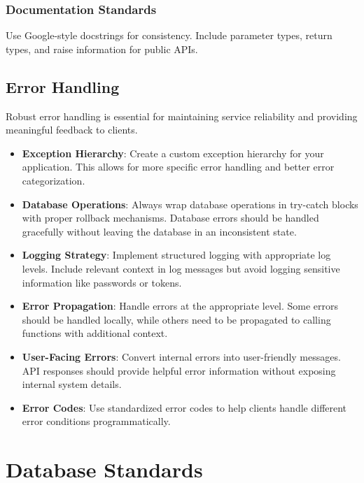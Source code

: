 \documentclass[12pt]{article}
\begin{document}
\subsubsection{Documentation Standards}
Use Google-style docstrings for consistency. Include parameter types, return types, and raise information for public APIs.

\subsection{Error Handling}
Robust error handling is essential for maintaining service reliability and providing meaningful feedback to clients.

\begin{itemize}
    \item \textbf{Exception Hierarchy}: Create a custom exception hierarchy for your application. This allows for more specific error handling and better error categorization.
    
    \item \textbf{Database Operations}: Always wrap database operations in try-catch blocks with proper rollback mechanisms. Database errors should be handled gracefully without leaving the database in an inconsistent state.
    
    \item \textbf{Logging Strategy}: Implement structured logging with appropriate log levels. Include relevant context in log messages but avoid logging sensitive information like passwords or tokens.
    
    \item \textbf{Error Propagation}: Handle errors at the appropriate level. Some errors should be handled locally, while others need to be propagated to calling functions with additional context.
    
    \item \textbf{User-Facing Errors}: Convert internal errors into user-friendly messages. API responses should provide helpful error information without exposing internal system details.
    
    \item \textbf{Error Codes}: Use standardized error codes to help clients handle different error conditions programmatically.
\end{itemize}

\section{Database Standards}
\end{document}
